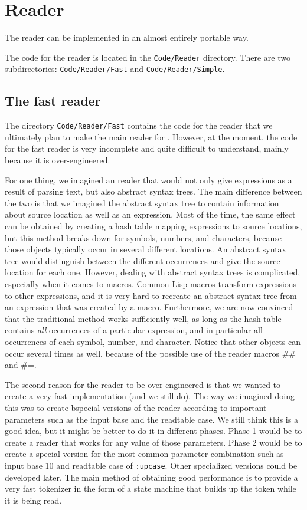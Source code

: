 \chapter{Reader}

The reader can be implemented in an almost entirely portable way.  

The code for the reader is located in the \texttt{Code/Reader}
directory.  There are two subdirectories: \texttt{Code/Reader/Fast}
and \texttt{Code/Reader/Simple}.  

\section{The fast reader}

The directory \texttt{Code/Reader/Fast} contains the code for the
reader that we ultimately plan to make the main reader for \sysname{}.
However, at the moment, the code for the fast reader is very
incomplete and quite difficult to understand, mainly because it is
over-engineered.  

For one thing, we imagined an reader that would not only give
expressions as a result of parsing text, but also abstract syntax
trees.  The main difference between the two is that we imagined the
abstract syntax tree to contain information about source location as
well as an expression.  Most of the time, the same effect can be
obtained by creating a hash table mapping expressions to source
locations, but this method breaks down for symbols, numbers, and
characters, because those objects typically occur in several different
locations.  An abstract syntax tree would distinguish between the
different occurrences and give the source location for each one.
However, dealing with abstract syntax trees is complicated, especially
when it comes to macros.  Common Lisp macros transform expressions to
other expressions, and it is very hard to recreate an abstract syntax
tree from an expression that was created by a macro.  Furthermore, we
are now convinced that the traditional method works sufficiently well,
as long as the hash table contains \emph{all} occurrences of a
particular expression, and in particular all occurrences of each
symbol, number, and character.  Notice that other objects can occur
several times as well, because of the possible use of the reader
macros \#\# and \#=.

The second reason for the reader to be over-engineered is that we
wanted to create a very fast implementation (and we still do).  The
way we imagined doing this was to create bspecial versions of the
reader according to important parameters such as the input base and
the readtable case.  We still think this is a good idea, but it might
be better to do it in different phases.  Phase 1 would be to create a
reader that works for any value of those parameters.  Phase 2 would be
to create a special version for the most common parameter combination
such as input base 10 and readtable case of \texttt{:upcase}.  Other
specialized versions could be developed later.  The main method of
obtaining good performance is to  provide a very fast tokenizer in the
form of a state machine that builds up the token while it is being
read.  

